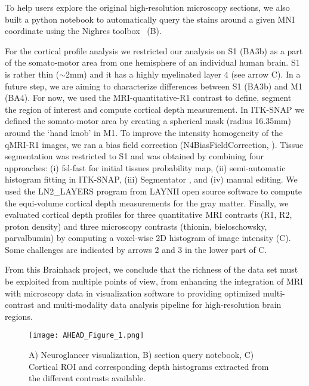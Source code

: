 \documentclass[../main.tex]{subfiles}
\begin{document}
To help users explore the original high-resolution microscopy sections, we also built a python notebook to automatically query the stains around a given MNI coordinate using the Nighres toolbox~\parencite{huntenburg_nighres_2018} (B).

For the cortical profile analysis we restricted our analysis on S1 (BA3b) as a part of the somato-motor area from one hemisphere of an individual human brain. S1 is rather thin (\(\sim\)2mm) and it has a highly myelinated layer 4 (see arrow C). In a future step, we are aiming to characterize differences between S1 (BA3b) and M1 (BA4). For now, we used the MRI-quantitative-R1 contrast to define, segment the region of interest and compute cortical depth measurement. In ITK-SNAP \parencite{Yushkevich2006} we defined the somato-motor area by creating a spherical mask (radius 16.35mm) around the ‘hand knob’ in M1. To improve the intensity homogeneity of the qMRI-R1 images, we ran a bias field correction (N4BiasFieldCorrection, \parencite{Cox1996}). Tissue segmentation was restricted to S1 and was obtained by combining four approaches: (i) fsl-fast \parencite{Smith2004} for initial tissues probability map, (ii) semi-automatic histogram fitting in ITK-SNAP, (iii) Segmentator \parencite{Gulban2018}, and (iv) manual editing. We used the LN2\_LAYERS program from LAYNII open source software \parencite{Huber2021}  to compute the equi-volume cortical depth measurements for the gray matter. Finally, we evaluated cortical depth profiles for three quantitative MRI contrasts (R1, R2, proton density) and three microscopy contrasts (thionin, bieloschowsky, parvalbumin) by computing a voxel-wise 2D histogram of image intensity (C). Some challenges are indicated by arrows 2 and 3 in the lower part of C.

From this Brainhack project, we conclude that the richness of the data set must be exploited from multiple points of view, from enhancing the integration of MRI with microscopy data in visualization software to providing optimized multi-contrast and multi-modality data analysis pipeline for high-resolution brain regions.



\begin{figure*}
	\centering
	\texttt{[image: AHEAD\_Figure\_1.png]}
	\caption{A) Neuroglancer visualization, B) section query notebook, C) Cortical ROI and corresponding depth histograms extracted from the different contrasts available.
	}
	\label{fig:ahead}
\end{figure*}
\end{document}
